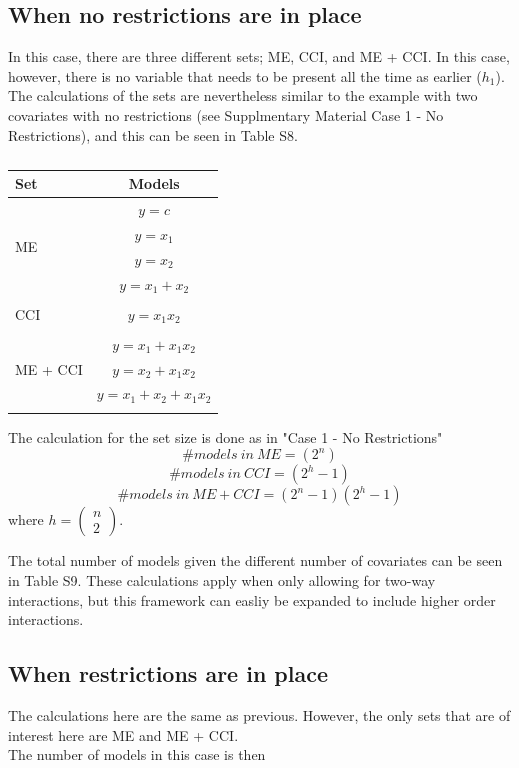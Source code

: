 \subsection{When no restrictions are in place}
In this case, there are three different sets; ME, CCI, and ME + CCI. In this case, however, there is no variable that needs to be present all the time as earlier ($h_1$). The calculations of the sets are nevertheless similar to the example with two covariates with no restrictions (see Supplmentary Material Case 1 - No Restrictions), and this can be seen in Table S8.  

\begin{table}
\caption{}
\centering
\begin{tabular}{lc} 
\toprule
Set & Models \\ 
\midrule
\multirow{4}{*}{ME} & $y=c$\\ & $y=x_1$\\ & $y=x_2$\\ & $y=x_1+x_2$\\ &  \\  
\multirow{1}{*}{CCI} & $y=x_1x_2$\\  & \\ 
\multirow{3}{*}{ME + CCI}  & $y=x_1 + x_1x_2$\\ & $y=x_2 + x_1x_2$\\ & $y=x_1+x_2 + x_1x_2$\\ &  \\  
\bottomrule
\end{tabular}
\end{table}

The calculation for the set size is done as in "Case 1 - No Restrictions"
\\
\[\#models\ in\ ME=\left(2^n\right)\] 
\[\#models\ in\ CCI=\left(2^h-1\right)\] 
\[\#models\ in\ ME+CCI=\left(2^n-1\right)\left(2^h-1\right)\] 
where $h=\left( \begin{array}{c}
n \\ 
2 \end{array}
\right)$. 

The total number of models given the different number of covariates can be seen in Table S9. These calculations apply when only allowing for two-way interactions, but this framework can easliy be expanded to include higher order interactions. \\




\subsection{When restrictions are in place}
The calculations here are the same as previous. However, the only sets that are of interest here are ME and ME + CCI.\\
The number of models in this case is then \\

